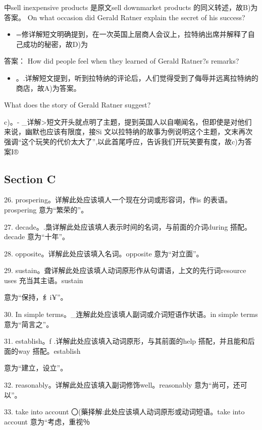 \documentclass[UTF8,11pt]{ctexart}
\begin{document}
中sell inexpensive products 是原文sell downmarket products 的同义转述，故B)为答案。 On what occasion did Gerald Ratner explain the secret of his success?


\begin{itemize}[leftmargin=2em,itemsep=.2em,topsep=.4em]\item[D.] =修详解短文明确提到，在一次英国上层商人会议上，拉特纳出席并解释了自己成功的秘密，故D)为
\end{itemize}

答案： How did people feel when they learned of Gerald Ratner?s remarks?


\begin{itemize}[leftmargin=2em,itemsep=.2em,topsep=.4em]\item[A.] 。.详解短文提到，听到拉特纳的评论后，人们觉得受到了侮辱并远离拉特纳的商店，故A)为答案。
\end{itemize}

What does the story of Gerald Ratner suggest?


c)。- \_详解>短文开头就点明了主题，提到英国人以自嘲闻名，但即使是对他们来说，幽默也应该有限度，接Si 文以拉特纳的故事为例说明这个主题，文末再次强调“这个玩笑的代价太大了”,以此首尾呼应，告诉我们开玩笑要有度，故c)为答案I®


\subsection*{Section C}


26. prospering。详解此处应该填人一个现在分词或形容词，作is 的表语。prospering 意为“繁荣的”。


27. decade。.梟详解此处应该填人表示时间的名词，与前面的介词during 搭配。decade 意为“十年”。


28. opposite。详解此处应该填入名词。opposite 意为“对立面”。


29. sustain。聋详解此处应该填人动词原形作从句谓语，上文的先行词resource uses 充当其主语。sustain


意为“保持，纟i¥”。


30. In simple terms。\_连解此处应该填人副词或介词短语作状语。in simple terms 意为“简言之”。


31. establish。f .详解此处应该填入动词原形，与其前面的help 搭配，并且能和后面的way 搭配。establish


意为“建立，设立”。


32. reasonably。详解此处应该填入副词修饰well。reasonably 意为“尚可，还可以”。


33. take into account 〇(藥择解:此处应该填人动词原形或动词短语。take into account 意为“考虑，重视％
\end{document}
